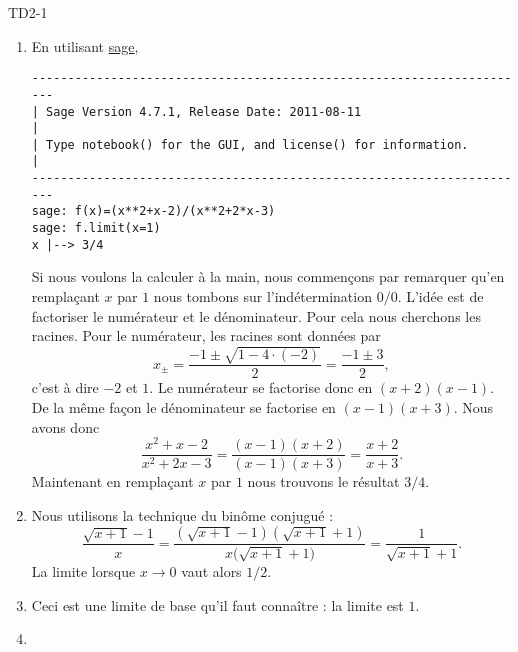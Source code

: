 
\begin{corrige}{TD2-1}

	\begin{enumerate}
		\item
            En utilisant \href{http://www.sagemath.org}{sage},
            \begin{verbatim}
----------------------------------------------------------------------
| Sage Version 4.7.1, Release Date: 2011-08-11                       |
| Type notebook() for the GUI, and license() for information.        |
----------------------------------------------------------------------
sage: f(x)=(x**2+x-2)/(x**2+2*x-3)
sage: f.limit(x=1)
x |--> 3/4
            \end{verbatim}
            Si nous voulons la calculer à la main, nous commençons par remarquer qu'en remplaçant \( x\) par \( 1\) nous tombons sur l'indétermination \( 0/0\). L'idée est de factoriser le numérateur et le dénominateur. Pour cela nous cherchons les racines. Pour le numérateur, les racines sont données par
            \begin{equation}
                x_{\pm}=\frac{ -1\pm\sqrt{1-4\cdot(-2)} }{ 2 }=\frac{ -1\pm3 }{2},
            \end{equation}
            c'est à dire \( -2\) et \( 1\). Le numérateur se factorise donc en \( (x+2)(x-1)\). De la même façon le dénominateur se factorise en \( (x-1)(x+3)\). Nous avons donc
            \begin{equation}
                \frac{ x^2+x-2 }{ x^2+2x-3 }=\frac{ (x-1)(x+2) }{ (x-1)(x+3) }=\frac{ x+2 }{ x+3 }.
            \end{equation}
            Maintenant en remplaçant \( x\) par \( 1\) nous trouvons le résultat \( 3/4\).
		\item
            Nous utilisons la technique du binôme conjugué :
            \begin{equation}
                \frac{ \sqrt{x+1}-1 }{ x }=\frac{ \left( \sqrt{x+1}-1 \right)\left( \sqrt{x+1}+1 \right) }{ x\big( \sqrt{x+1}+1 \big) }=\frac{ 1 }{ \sqrt{x+1}+1 }.
            \end{equation}
            La limite lorsque \( x\to 0\) vaut alors \( 1/2\).
		\item
			Ceci est une limite de base qu'il faut connaître : la limite est $1$.
		\item

\end{enumerate}
\end{corrige}
